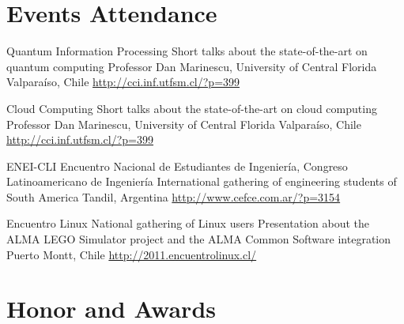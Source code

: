 \documentclass[11pt,a4paper,sans]{moderncv}
\begin{document}
\section{Events Attendance}

        {Quantum Information Processing}
        {Short talks about the state-of-the-art on quantum computing}
        {Professor Dan Marinescu, University of Central Florida}
        {Valparaíso, Chile}
        {\url{http://cci.inf.utfsm.cl/?p=399}}
        
        {Cloud Computing}
        {Short talks about the state-of-the-art on cloud computing}
        {Professor Dan Marinescu, University of Central Florida}
        {Valparaíso, Chile}
        {\url{http://cci.inf.utfsm.cl/?p=399}}

        {ENEI-CLI}
        {Encuentro Nacional de Estudiantes de Ingeniería, Congreso Latinoamericano de Ingeniería}
        {International gathering of engineering students of South America}
        {Tandil, Argentina}
        {\url{http://www.cefce.com.ar/?p=3154}}

        {Encuentro Linux}
        {National gathering of Linux users}
        {Presentation about the ALMA LEGO Simulator project and the ALMA Common Software integration}
        {Puerto Montt, Chile}
        {\url{http://2011.encuentrolinux.cl/}}
        
\section{Honor and Awards}


\end{document}
